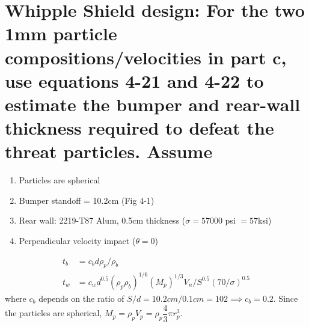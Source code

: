 \documentclass[onecolumn,10pt]{jhwhw}
\begin{document}
\part{Whipple Shield design: For the two 1mm particle compositions/velocities in part c, use equations 4-21 and 4-22 to estimate the bumper and rear-wall thickness required to defeat the threat particles. Assume}
\begin{enumerate}
\item Particles are spherical
\item Bumper standoff = 10.2cm (Fig 4-1)
\item Rear wall: 2219-T87 Alum, 0.5cm thickness ($\sigma = 57000$ psi $= 57 $ksi)
\item Perpendicular velocity impact ($\theta=0$)
\end{enumerate}
\begin{align*}
t_b &= c_b d \rho_p / \rho_b \\
t_w &= c_w d^{0.5} \left( \rho_p \rho_b \right)^{1/6} \left( M_p \right)^{1/3} V_n / S^{0.5} \left( 70/\sigma \right)^{0.5}
\end{align*}
where $c_b$ depends on the ratio of $S/d=10.2cm/0.1cm=102 \implies c_b = 0.2$. Since the particles are spherical, $M_p = \rho_p V_p = \rho_p \dfrac{4}{3} \pi r_p^3$.
\end{document}
